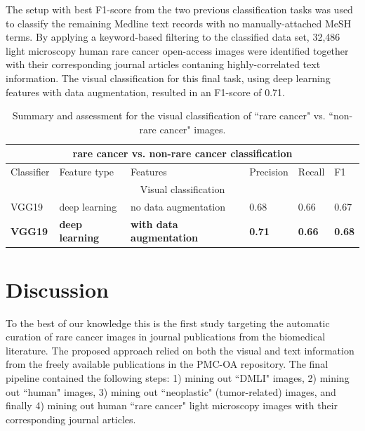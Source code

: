 \documentclass[]{spie}  %
\begin{document}
\vspace{5mm}
%
The setup with best F1-score from the two previous classification tasks was used to classify the remaining Medline text records with no manually-attached MeSH terms.
By applying a keyword-based filtering to the classified data set, 32,486 light microscopy human rare cancer open-access images were identified together with their corresponding journal articles contaning highly-correlated text information. 
The visual classification for this final task, using deep learning features with data augmentation, resulted in an F1-score of 0.71.
%
\begin{table}[ht]
\caption{Summary and assessment for the visual classification of ``rare cancer" vs. ``non-rare cancer" images.}
\label{table:3}
\centering
\begin{tabular}{ |p{1.5cm}|p{3.0cm}|p{5.0cm}|p{1.5cm}|p{1.5cm}|p{1.5cm}|  }
 \hline
 \multicolumn{6}{|c|}{rare cancer vs. non-rare cancer classification} \\
 \hline
 Classifier  & Feature type & Features & Precision & Recall & F1\\
 \hline
\multicolumn{6}{|c|}{Visual classification} \\
\hline
VGG19 & deep learning & no data augmentation & 0.68 & 0.66 & 0.67 \\
\textbf{VGG19} & \textbf{deep learning} & \textbf{with data augmentation} & \textbf{0.71} & \textbf{0.66} & \textbf{0.68} \\
\hline
 \end{tabular}
\end{table}
\vspace{5mm}
%
\section{Discussion}
%
To the best of our knowledge this is the first study targeting the automatic curation of rare cancer images in journal publications from the biomedical literature.
The proposed approach relied on both the visual and text information from the freely available publications in the PMC-OA repository.
The final pipeline contained the following steps: 1) mining out ``DMLI" images, 2) mining out ``human" images, 3) mining out ``neoplastic" (tumor-related) images, and finally 4) mining out human ``rare cancer" light microscopy images with their corresponding journal articles.
\end{document}
